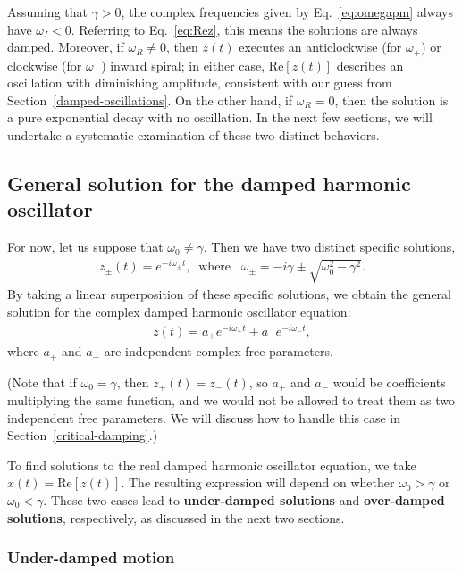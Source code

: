 \documentclass[10pt,a4paper]{article}
\begin{document}
Assuming that $\gamma > 0$, the complex frequencies given by
Eq.~\eqref{eq:omegapm} always have $\omega_I < 0$.  Referring to
Eq.~\eqref{eq:Rez}, this means the solutions are always damped.
Moreover, if $\omega_R \ne 0$, then $z(t)$ executes an anticlockwise
(for $\omega_+$) or clockwise (for $\omega_-$) inward spiral; in
either case, $\mathrm{Re}[z(t)]$ describes an oscillation with
diminishing amplitude, consistent with our guess from
Section~\ref{damped-oscillations}.  On the other hand, if $\omega_R =
0$, then the solution is a pure exponential decay with no oscillation.
In the next few sections, we will undertake a systematic examination
of these two distinct behaviors.

\subsection{General solution for the damped harmonic oscillator}
\label{general-solution}

For now, let us suppose that $\omega_0 \ne \gamma$. Then we have two
distinct specific solutions,
\begin{align}
  z_\pm(t) = e^{-i\omega_\pm t}, \;\;\mathrm{where}\;\;\; \omega_\pm = -i\gamma \pm \sqrt{\omega_0^2 - \gamma^2}.
\end{align}
By taking a linear superposition of these specific solutions, we
obtain the general solution for the complex damped harmonic oscillator
equation:
\begin{align}
  z(t) = a_+ e^{-i\omega_+ t} + a_- e^{-i\omega_- t},
  \label{eq:gsol}
\end{align}
where $a_+$ and $a_-$ are independent complex free parameters.

(Note that if $\omega_0 = \gamma$, then $z_+(t) = z_-(t)$, so $a_+$
and $a_-$ would be coefficients multiplying the same function, and we
would not be allowed to treat them as two independent free
parameters. We will discuss how to handle this case in
Section~\ref{critical-damping}.)

To find solutions to the real damped harmonic oscillator equation, we
take $x(t) = \mathrm{Re}[z(t)]$. The resulting expression will depend
on whether $\omega_0 > \gamma$ or $\omega_0 < \gamma$. These two cases
lead to \textbf{under-damped solutions} and \textbf{over-damped
  solutions}, respectively, as discussed in the next two sections.

\subsubsection{Under-damped motion}
\label{underdamped}
\end{document}
